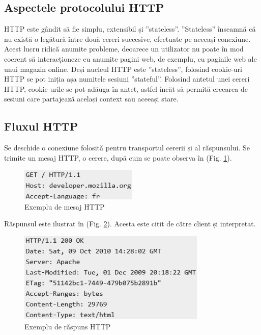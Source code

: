 \subsection{Aspectele protocolului HTTP}
HTTP este gândit să fie simplu, extensibil și ”stateless”. ”Stateless” înseamnă că nu există o legătură între două cereri succesive, efectuate pe aceeași conexiune. Acest lucru ridică anumite probleme, deoarece un utilizator nu poate în mod coerent să interacționeze cu anumite pagini web, de exemplu, cu paginile web ale unui magazin online. Deși nucleul HTTP este ”stateless”, folosind cookie-uri HTTP se pot iniția așa numitele sesiuni ”stateful”. Folosind antetul unei cereri HTTP, cookie-urile se pot adăuga în antet, astfel încăt să permită creearea de sesiuni care partajează același context sau aceeași stare.

\subsection{Fluxul HTTP}
Se deschide o conexiune folosită pentru transportul cererii și al răspunsului.
Se trimite un mesaj HTTP, o cerere, după cum se poate observa în (Fig. \ref{fig:22}).

\begin{figure}[!htb]
	\centering
	\includegraphics[width=0.5\textwidth]
	{../LaTeX/Images/http_message.PNG}
	\caption{Exemplu de mesaj HTTP}
	\label{fig:22}
\end{figure}

Răspunsul este ilustrat în (Fig. \ref{fig:23}). Acesta este citit de către client și interpretat.

\begin{figure}[!htb]
	\centering
	\includegraphics[width=0.8\textwidth]
	{../LaTeX/Images/http_response.PNG}
	\caption{Exemplu de răspuns HTTP}
	\label{fig:23}
\end{figure}

